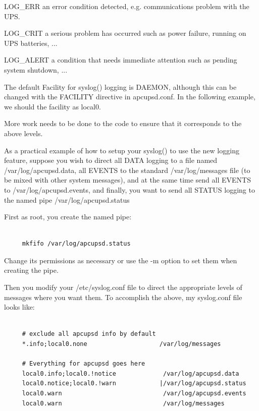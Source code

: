 {{{{{{{{{{LOG\_ERR an error condition detected, e.g. communications problem with the
UPS.  

LOG\_CRIT a serious problem has occurred such as power failure, running on UPS
batteries, ...  

LOG\_ALERT a condition that needs immediate attention such as pending system
shutdown, ...  

The default Facility for syslog() logging is DAEMON, although this can be
changed with the FACILITY directive in apcupsd.conf. In the following example,
we should the facility as local0.  

More work needs to be done to the code to ensure that it corresponds to the
above levels.  

As a practical example of how to setup your syslog() to use the new logging
feature, suppose you wish to direct all DATA logging to a file named
/var/log/apcupsd.data, all EVENTS to the standard /var/log/messages file (to
be mixed with other system messages), and at the same time send all EVENTS to
/var/log/apcupsd.events, and finally, you want to send all STATUS logging to
the named pipe /var/log/apcupsd.status  

First as root, you create the named pipe: 

\footnotesize
\begin{verbatim}
     
     mkfifo /var/log/apcupsd.status
\end{verbatim}
\normalsize

Change its permissions as necessary or use the -m option to set them when
creating the pipe.  

Then you modify your /etc/syslog.conf file to direct the appropriate levels of
messages where you want them. To accomplish the above, my syslog.conf file
looks like: 

\footnotesize
\begin{verbatim}
     
     # exclude all apcupsd info by default
     *.info;local0.none                    /var/log/messages
     
     # Everything for apcupsd goes here
     local0.info;local0.!notice             /var/log/apcupsd.data
     local0.notice;local0.!warn            |/var/log/apcupsd.status
     local0.warn                            /var/log/apcupsd.events
     local0.warn                            /var/log/messages
\end{verbatim}
\normalsize

\label{Developers-Notes}

}}}}}}}}}}
